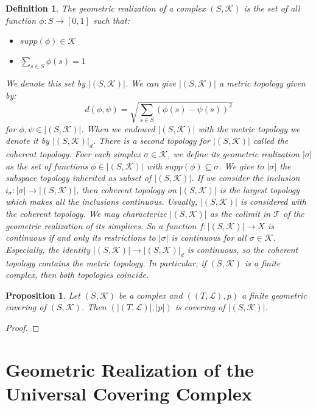 \documentclass{amsart}
\newtheorem{proposition}{Proposition}[section]
\newtheorem{definition}{Definition}[section]
\begin{document}
\begin{definition}
The geometric realization of a complex $(S,\mathcal{K})$ is the set of all function $\phi\colon S\longrightarrow [0,1]$ such that:
\begin{itemize}
\item $supp(\phi)\in\mathcal{K}$
\item $\sum_{s\in S}\phi(s)=1$
\end{itemize}
We denote this set by $\vert (S,\mathcal{K})\vert$. We can give $\vert (S,\mathcal{K})\vert$ a metric topology given by:
\[
d(\phi,\psi)=\sqrt{\sum_{s\in S}(\phi(s)-\psi(s))^{2}}
\]
for $\phi,\psi\in \vert (S,\mathcal{K})\vert$. When we endowed $\vert (S,\mathcal{K})\vert$ with the metric topology we denote it by $\vert (S,\mathcal{K})\vert_d$. There is a second topology for $\vert (S,\mathcal{K})\vert$ called the coherent topology. Foer each simplex $\sigma\in\mathcal{K}$, we define its geometric realization $\vert\sigma\vert$ as the set of functions $\phi\in \vert (S,\mathcal{K})\vert$ with $supp(\phi)\subseteq \sigma$. We give to $\vert \sigma\vert$ the subspace topology inherited as subset of $\vert (S,\mathcal{K})\vert$. If we consider the inclusion $i_\sigma\colon\vert\sigma\vert\longrightarrow \vert (S,\mathcal{K})\vert$, then coherent topology on $\vert (S,\mathcal{K})\vert$ is the largest topology which makes all the inclusions continuous. Usually, $\vert (S,\mathcal{K})\vert$ is considered with the coherent topology. We may characterize $\vert (S,\mathcal{K})\vert$ as the colimit  in $\mathcal{T}$ of the geometric realization of its simplices. So a function $f\colon\vert (S,\mathcal{K})\vert\longrightarrow X$ is continuous if and only its restrictions to $\vert\sigma\vert$ is continuous for all $\sigma\in\mathcal{K}$. Especially, the identity $\vert (S,\mathcal{K})\vert\longrightarrow \vert (S,\mathcal{K})\vert_d$ is continuous, so the coherent topology contains the metric topology. In particular, if $(S,\mathcal{K})$ is a finite complex, then both topologies coincide.
\end{definition}







\begin{proposition}
Let $(S,\mathcal{K})$ be a complex and $((T,\mathcal{L}),p)$ a finite geometric covering of $(S,\mathcal{K})$. Then $(\vert (T,\mathcal{L})\vert,\vert p\vert)$ is covering of $\vert (S,\mathcal{K})\vert$.
\end{proposition}

\begin{proof}

\end{proof}

\section{Geometric Realization of the Universal Covering Complex}





\end{document}
